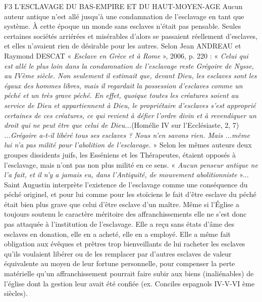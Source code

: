 F3 L'ESCLAVAGE DU BAS-EMPIRE ET DU HAUT-MOYEN-AGE
 Aucun auteur antique n'est allé jusqu'à une condamnation de l'esclavage en tant que système. À cette époque un monde sans esclaves n'était pas pensable. Seules certaines sociétés arriérées et misérables d'alors se passaient réellement d'esclaves, et elles n'avaient rien de désirable pour les autres. 
 Selon Jean ANDREAU et Raymond DESCAT « \emph{Esclave en Grèce et à Rome} », 2006, p. 220 : « \emph{Celui qui est allé le plus loin dans la condamnation de l'esclavage reste Grégoire de Nysse, au IVème siècle. Non seulement il estimait que, devant Dieu, les esclaves sont les égaux des hommes libres, mais il regardait la possession d'esclaves comme un péché et un très grave péché. En effet, quoique toutes les créatures soient au service de Dieu et appartiennent à Dieu, le propriétaire d'esclaves s'est approprié certaines de ces créatures, ce qui revient à défier l'ordre divin et à revendiquer un droit qui ne peut être que celui de Dieu...}(Homélie IV sur l'Ecclésiaste, 2, 7) \emph{...Grégoire a-t-il libéré tous ses esclaves ? Nous n'en savons rien. Mais ...même lui n'a pas milité pour l'abolition de l'esclavage.} » Selon les mêmes auteurs deux groupes dissidents juifs, les Esséniens et les Thérapeutes, étaient opposés à l'esclavage, mais n'ont pas non plus milité en ce sens. « \emph{Aucun penseur antique ne l'a fait, et il n'y a jamais eu, dans l'Antiquité, de mouvement abolitionniste} »...
 Saint Augustin interprète l'existence de l'esclavage comme une conséquence du péché originel, et pour lui comme pour les stoïciens le fait d'être esclave du péché était bien plus grave que celui d'être esclave d'un maître. Même si l'Église a toujours soutenu le caractère méritoire des affranchissements elle ne s'est donc pas attaquée à l'institution de l'esclavage. Elle a reçu sans états d'âme des esclaves en donation, elle en a acheté, elle en a employé. Elle a même fait obligation aux évêques et prêtres trop bienveillants de lui racheter les esclaves qu'ils voulaient libérer ou de les remplacer par d'autres esclaves de valeur équivalente au moyen de leur fortune personnelle, pour compenser la perte matérielle qu'un affranchissement pourrait faire subir aux biens (inaliénables) de l'église dont la gestion leur avait été confiée (ex. Conciles espagnols IV-V-VI ème siècles). 
